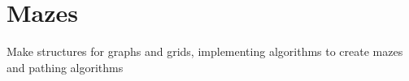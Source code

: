 \chapter{Mazes}
\hypertarget{md__r_e_a_d_m_e}{}\label{md__r_e_a_d_m_e}
\label{md__r_e_a_d_m_e_autotoc_md0}%
%


Make structures for graphs and grids, implementing algorithms to create mazes and pathing algorithms 